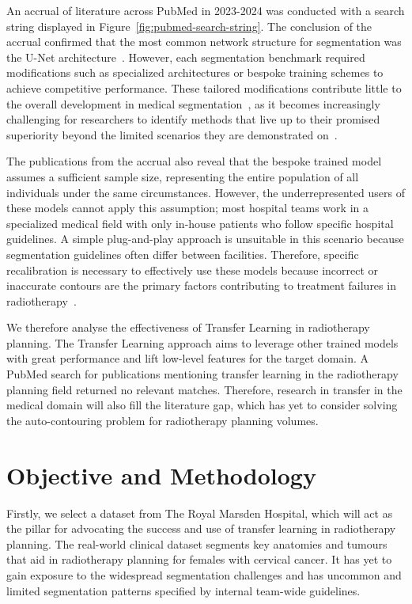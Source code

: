 \documentclass[12pt,twoside]{report}
\begin{document}
An accrual of literature across PubMed in 2023-2024 was conducted with a search string displayed in Figure~\ref{fig:pubmed-search-string}. The conclusion of the accrual confirmed that the most common network structure for segmentation was the U-Net architecture~\cite{Samarasinghe2021-ps,Lin2021-oz,Sartor2020-et,LIU2020184,Rhee2020-ms,LIU2020172}. However, each segmentation benchmark required modifications such as specialized architectures or bespoke training schemes to achieve competitive performance. These tailored modifications contribute little to the overall development in medical segmentation~\cite{isensee2024nnunet}, as it becomes increasingly challenging for researchers to identify methods that live up to their promised superiority beyond the limited scenarios they are demonstrated on~\cite{nnunet}.

The publications from the accrual also reveal that the bespoke trained model assumes a sufficient sample size, representing the entire population of all individuals under the same circumstances. However, the underrepresented users of these models cannot apply this assumption; most hospital teams work in a specialized medical field with only in-house patients who follow specific hospital guidelines. A simple plug-and-play approach is unsuitable in this scenario because segmentation guidelines often differ between facilities. Therefore, specific recalibration is necessary to effectively use these models because incorrect or inaccurate contours are the primary factors contributing to treatment failures in radiotherapy~\cite{Rhee2020-ms}.

We therefore analyse the effectiveness of Transfer Learning in radiotherapy planning. The Transfer Learning approach aims to leverage other trained models with great performance and lift low-level features for the target domain. A PubMed search for publications mentioning transfer learning in the radiotherapy planning field returned no relevant matches. Therefore, research in transfer in the medical domain will also fill the literature gap, which has yet to consider solving the auto-contouring problem for radiotherapy planning volumes. 

\section{Objective and Methodology}

Firstly, we select a dataset from The Royal Marsden Hospital, which will act as the pillar for advocating the success and use of transfer learning in radiotherapy planning. The real-world clinical dataset segments key anatomies and tumours that aid in radiotherapy planning for females with cervical cancer. It has yet to gain exposure to the widespread segmentation challenges and has uncommon and limited segmentation patterns specified by internal team-wide guidelines.
\end{document}
